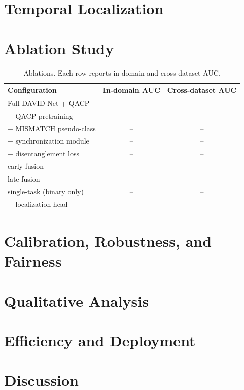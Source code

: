 \section{Temporal Localization}

\section{Ablation Study}
\begin{table}[h]
\centering
\caption{Ablations. Each row reports in-domain and cross-dataset AUC. }
\label{tab:ablation}
\small
\begin{tabular}{lcc}
\toprule
\textbf{Configuration} & \textbf{In-domain AUC} & \textbf{Cross-dataset AUC} \\
\midrule
Full DAVID-Net + QACP            & -- & -- \\
$-$ QACP pretraining             & -- & -- \\
$-$ MISMATCH pseudo-class        & -- & -- \\
$-$ synchronization module       & -- & -- \\
$-$ disentanglement loss         & -- & -- \\
early fusion                     & -- & -- \\
late fusion                      & -- & -- \\
single-task (binary only)        & -- & -- \\
$-$ localization head            & -- & -- \\
\bottomrule
\end{tabular}
\end{table}

\section{Calibration, Robustness, and Fairness}

\section{Qualitative Analysis}

\section{Efficiency and Deployment}

\section{Discussion}
